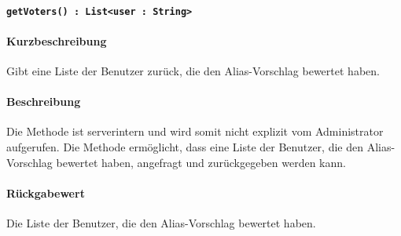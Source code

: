 \paragraph{\texttt{getVoters() : List<user : String>}}%
\paragraph*{Kurzbeschreibung}
Gibt eine Liste der Benutzer zurück, die den Alias-Vorschlag bewertet haben.
\paragraph*{Beschreibung}
Die Methode ist serverintern und wird somit nicht explizit vom Administrator aufgerufen.
Die Methode ermöglicht, dass eine Liste der Benutzer, die den Alias-Vorschlag bewertet haben, angefragt und zurückgegeben werden kann.
\paragraph*{Rückgabewert}
Die Liste der Benutzer, die den Alias-Vorschlag bewertet haben.
